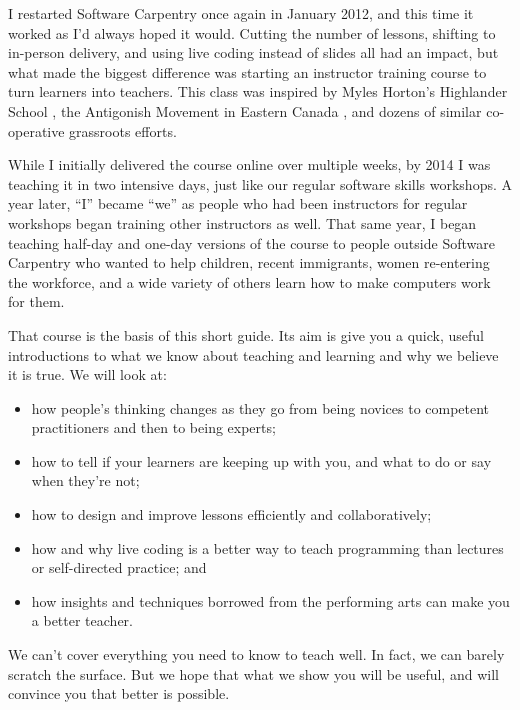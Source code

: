 I restarted Software Carpentry once again in January 2012, and this
time it worked as I'd always hoped it would.  Cutting the number of
lessons, shifting to in-person delivery, and using live coding instead
of slides all had an impact, but what made the biggest difference was
starting an instructor training course to turn learners into teachers.
This class was inspired by Myles Horton's Highlander School
\cite{fixme}, the Antigonish Movement in Eastern Canada \cite{fixme},
and dozens of similar co-operative grassroots efforts.

While I initially delivered the course online over multiple weeks, by
2014 I was teaching it in two intensive days, just like our regular
software skills workshops.  A year later, ``I'' became ``we'' as
people who had been instructors for regular workshops began training
other instructors as well.  That same year, I began teaching half-day
and one-day versions of the course to people outside Software
Carpentry who wanted to help children, recent immigrants, women
re-entering the workforce, and a wide variety of others learn how to
make computers work for them.

That course is the basis of this short guide.  Its aim is give you a
quick, useful introductions to what we know about teaching and
learning and why we believe it is true.  We will look at:

\begin{itemize}

\item
  how people's thinking changes as they go from being novices to
  competent practitioners and then to being experts;

\item
  how to tell if your learners are keeping up with you, and what to
  do or say when they're not;

\item
  how to design and improve lessons efficiently and collaboratively;

\item
  how and why live coding is a better way to teach programming than
  lectures or self-directed practice; and

\item
  how insights and techniques borrowed from the performing arts can
  make you a better teacher.

\end{itemize}

\noindent
We can't cover everything you need to know to teach well.  In fact,
we can barely scratch the surface.  But we hope that what we show you
will be useful, and will convince you that better is possible.

